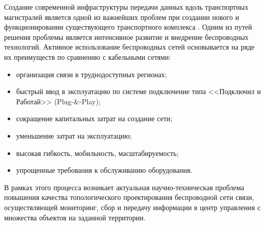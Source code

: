 

Создание современной инфраструктуры передачи данных вдоль транспортных магистралей является одной из важнейших проблем при создании нового и функционировании существующего транспортного комплекса  \cite{Vishnevsky2016_Review_of_methodology}. Одним из путей решения проблемы является интенсивное развитие и внедрение беспроводных технологий. Активное использование беспроводных сетей основывается на ряде их преимуществ по сравнению с кабельными сетями:
\begin{itemize}
    \item организация связи в труднодоступных регионах;
    \item быстрый ввод в эксплуатацию по системе подключение типа <<Подключил и Работай>> (Plug-\&-Play);
    \item сокращение капитальных затрат на создание сети; 
    \item уменьшение затрат на эксплуатацию;
    \item высокая гибкость, мобильность, масштабируемость;
    \item упрощенные требования к обслуживанию оборудования.
\end{itemize}

В рамках этого процесса возникает актуальная научно-техническая проблема повышения качества топологического проектирования беспроводной сети связи, осуществляющей мониторинг, сбор и передачу информации в центр управления с множества объектов на заданной территории.   





